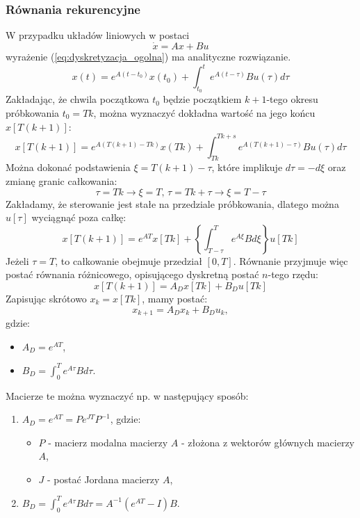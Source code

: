 \documentclass{article}
\begin{document}
        \subsubsection{Równania rekurencyjne}
        W przypadku układów liniowych w postaci
        $$
            \dot{x} = Ax + Bu
        $$
        wyrażenie (\ref{eq:dyskretyzacja_ogolna})  ma analityczne rozwiązanie.
        $$
            x(t) = e^{A(t-t_{0})}x(t_{0}) + \int_{t_{0}}^{t}{e^{A(t-\tau)}Bu(\tau)d\tau}
        $$
        Zakładając, że chwila początkowa $t_{0}$ będzie początkiem $k+1$-tego okresu próbkowania $t_{0} = Tk$, można wyznaczyć dokładna wartość na jego końcu $x[T(k+1)]$:
        $$
            x[T(k+1)] = e^{A(T(k+1) - Tk)}x(Tk) + \int_{Tk}^{Tk+s}{e^{A(T(k+1) - \tau)}Bu(\tau)d\tau}
        $$
        Można dokonać podstawienia $\xi = T(k+1) - \tau$, które implikuje $d\tau = -d\xi$ oraz zmianę granic całkowania:
        $$
            \tau=Tk \rightarrow \xi = T,\,\tau =Tk + \tau \rightarrow \xi = T-\tau
        $$
        Zakładamy, że sterowanie jest stałe na przedziale próbkowania, dlatego można $u[\tau]$ wyciągnąć poza całkę:
        $$
            x[T(k+1)] = e^{AT}x[Tk] + \left\{ \int_{T-\tau}^{T}{e^{A\xi}Bd\xi} \right\} u[Tk]
        $$
        Jeżeli $\tau = T$, to całkowanie obejmuje przedział $[0,T]$.
        Równanie przyjmuje więc postać równania różnicowego, opisującego dyskretną postać $n$-tego rzędu:
        \begin{equation}
            \label{eq:rownanie_roznicowe}
            x[T(k+1)] = A_{D}x[Tk] + B_{D}u[Tk]
        \end{equation}
        Zapisując skrótowo $x_{k} = x[Tk]$, mamy postać:
        $$
            x_{k+1} = A_{D}x_{k} + B_{D}u_{k},
        $$
        gdzie:
        \begin{itemize}
            \item $A_{D} = e^{AT}$,
            \item $B_{D} = \int_{0}^{T}{e^{A\tau}Bd\tau}$.
        \end{itemize}

        Macierze te można wyznaczyć np. w następujący sposób:
        \begin{enumerate}
            \item $A_{D} =e^{AT} = Pe^{JT}P^{-1}$, gdzie:
                \begin{itemize}
                    \item $P$ - macierz modalna macierzy $A$ - złożona z wektorów głównych macierzy $A$,
                    \item $J$ - postać Jordana macierzy $A$,
                \end{itemize}

            \item $B_{D} = \int_{0}^{T}{e^{A\tau}Bd\tau} = A^{-1}\left( e^{AT} - I \right)B$.
        \end{enumerate}
\end{document}
